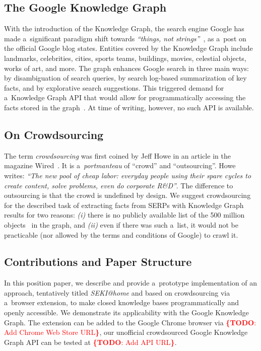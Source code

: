 \documentclass[runningheads,a4paper]{llncs}
\newcommand{\todo}[1]{\noindent\textcolor{red}{{\bf \{TODO}: #1{\bf \}}}}
\begin{document}
\subsection{The Google Knowledge Graph}
With the introduction of the Knowledge Graph, the search engine Google
has made a~significant paradigm shift towards \textit{``things, not strings''}~\cite{singhal2012},
as a~post on the official Google blog states.
Entities covered by the Knowledge Graph include landmarks, celebrities, cities, sports
teams, buildings, movies, celestial objects, works of art, and more.
The graph enhances Google search in three main ways:
by disambiguation of search queries,
by search log-based summarization of key facts,
and by explorative search suggestions.
This triggered demand for a~Knowledge Graph API that would allow for
programmatically accessing the facts stored in the graph~\cite{quora2012}.
At time of writing, however, no such API is available.

\subsection{On Crowdsourcing}
The term \emph{crowdsourcing} was first coined by Jeff Howe
in an article in the magazine Wired~\cite{howe2006}.
It is a~\textit{portmanteau} of ``crowd'' and ``outsourcing''.
Howe writes: \textit{``The new pool of cheap labor:
everyday people using their spare cycles to create content, solve problems,
even do corporate R\&D''}.
The difference to outsourcing is that the crowd is undefined by design.
We suggest crowdsourcing for the described task of extracting facts from
SERPs with Knowledge Graph results for two reasons:
\textit{(i)} there is no publicly available list
of the 500 million objects~\cite{singhal2012} in the graph, and
\textit{(ii)} even if there was such a~list,
it would not be practicable (nor allowed by the terms and conditions of Google)
to crawl it.

\subsection{Contributions and Paper Structure}
In this position paper, we describe and provide a~prototype implementation
of an approach, tentatively titled \emph{SEKI@home} and
based on crowdsourcing via a~browser extension,
to make closed knowledge bases programmatically and openly accessible.
We demonstrate its applicability with the Google Knowledge Graph.
The extension can be added to the Google Chrome browser via \todo{Add Chrome Web Store URL},
our unofficial crowdsourced Google Knowledge Graph API can be tested at
\todo{Add API URL}.
\end{document}
